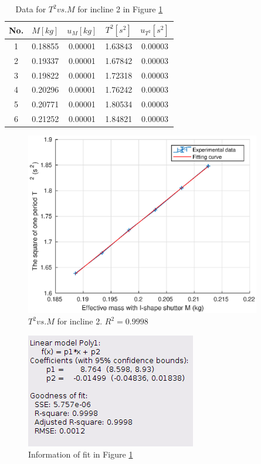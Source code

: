     \begin{table}\small
        \centering
        \begin{tabular}{|c|c|c|c|c|}
            \hline
            No. & $M[kg]$ & $u_{M}[kg]$ & $T^2[s^2]$ & $u_{T^2}[s^2]$\\ \hline
            1 & 0.18855 & 0.00001 & 1.63843 & 0.00003\\ \hline
            2 & 0.19337 & 0.00001 & 1.67842 & 0.00003\\ \hline
            3 & 0.19822 & 0.00001 & 1.72318 & 0.00003\\ \hline
            4 & 0.20296 & 0.00001 & 1.76242 & 0.00003\\ \hline
            5 & 0.20771 & 0.00001 & 1.80534 & 0.00003\\ \hline
            6 & 0.21252 & 0.00001 & 1.84821 & 0.00003\\ \hline
        \end{tabular}
        \caption{Data for $T^2 vs. M$ for incline 2 in Figure \ref{tmi2}}\label{tmi2data}
    \end{table}

    \begin{figure}[!h]
        \centering
        \includegraphics[height=8cm]{images/tmi2.eps}
        \caption{$T^2 vs. M$ for incline 2. $R^2=0.9998$}\label{tmi2}
    \end{figure}
    \begin{figure}[h]
        \centering
        \includegraphics[height=5cm]{images/tmi2info.png}
        \caption{Information of fit in Figure \ref{tmi2}}\label{tmi2info}
    \end{figure}

